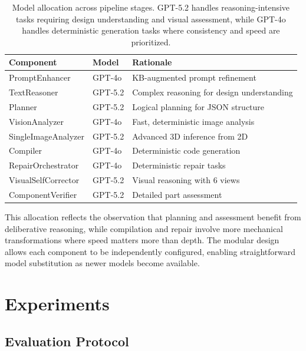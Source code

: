 \documentclass[5p,twocolumn,10pt,times]{elsarticle}
\begin{document}
\begin{table}[t]
\centering
\caption{Model allocation across pipeline stages. GPT-5.2 handles reasoning-intensive tasks requiring design understanding and visual assessment, while GPT-4o handles deterministic generation tasks where consistency and speed are prioritized.}
\label{tab:model-allocation}
\small
\begin{tabular}{lll}
\toprule
\textbf{Component} & \textbf{Model} & \textbf{Rationale} \\
\midrule
PromptEnhancer & GPT-4o & KB-augmented prompt refinement \\
TextReasoner & GPT-5.2 & Complex reasoning for design understanding \\
Planner & GPT-5.2 & Logical planning for JSON structure \\
VisionAnalyzer & GPT-4o & Fast, deterministic image analysis \\
SingleImageAnalyzer & GPT-5.2 & Advanced 3D inference from 2D \\
Compiler & GPT-4o & Deterministic code generation \\
RepairOrchestrator & GPT-4o & Deterministic repair tasks \\
VisualSelfCorrector & GPT-5.2 & Visual reasoning with 6 views \\
ComponentVerifier & GPT-5.2 & Detailed part assessment \\
\bottomrule
\end{tabular}
\end{table}

This allocation reflects the observation that planning and assessment benefit from deliberative reasoning, while compilation and repair involve more mechanical transformations where speed matters more than depth. The modular design allows each component to be independently configured, enabling straightforward model substitution as newer models become available.



\section{Experiments}
\label{sec:experiments}

\subsection{Evaluation Protocol}
\end{document}
